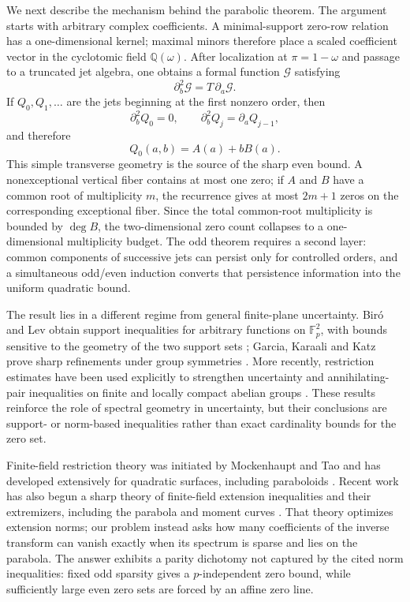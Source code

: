 \documentclass[11pt]{article}
\newcommand{\F}{\mathbb F}
\newcommand{\Q}{\mathbb Q}
\begin{document}
We next describe the mechanism behind the parabolic theorem.  The argument
starts with arbitrary complex coefficients.  A minimal-support zero-row
relation has a one-dimensional kernel; maximal minors therefore place a
scaled coefficient vector in the cyclotomic field $\Q(\omega)$.  After
localization at $\pi=1-\omega$ and passage to a truncated jet algebra, one
obtains a formal function $\mathcal G$ satisfying
\begin{equation}
 \partial_b^2\mathcal G=T\,\partial_a\mathcal G.
 \label{eq:intro-schrodinger}
\end{equation}
If $Q_0,Q_1,\ldots$ are the jets beginning at the first nonzero order, then
\[
 \partial_b^2Q_0=0,
 \qquad
 \partial_b^2Q_j=\partial_aQ_{j-1},
\]
and therefore
\[
 Q_0(a,b)=A(a)+bB(a).
\]
This simple transverse geometry is the source of the sharp even bound.  A
nonexceptional vertical fiber contains at most one zero; if $A$ and $B$ have
a common root of multiplicity $m$, the recurrence gives at most $2m+1$ zeros
on the corresponding exceptional fiber.  Since the total common-root
multiplicity is bounded by $\deg B$, the two-dimensional zero count collapses
to a one-dimensional multiplicity budget.  The odd theorem requires a second
layer: common components of successive jets can persist only for controlled
orders, and a simultaneous odd/even induction converts that persistence
information into the uniform quadratic bound.

The result lies in a different regime from general finite-plane uncertainty.
Bir\'o and Lev obtain support inequalities for arbitrary functions on
$\F_p^2$, with bounds sensitive to the geometry of the two support sets
\cite{BiroLev}; Garcia, Karaali and Katz prove sharp refinements under group
symmetries \cite{GarciaKaraaliKatz}.  More recently, restriction estimates
have been used explicitly to strengthen uncertainty and annihilating-pair
inequalities on finite and locally compact abelian groups
\cite{IosevichMayeli,IosevichJamingMayeli}.  These results reinforce the role
of spectral geometry in uncertainty, but their conclusions are support- or
norm-based inequalities rather than exact cardinality bounds for the zero set.

Finite-field restriction theory was initiated by Mockenhaupt and Tao
\cite{MockenhauptTao} and has developed extensively for quadratic surfaces,
including paraboloids \cite{Lewko,LewkoKakeya,IKL}.  Recent work has also
begun a sharp theory of finite-field extension inequalities and their
extremizers, including the parabola and moment curves
\cite{GonzalezOliveira,BiswasEtAl}.  That theory optimizes extension norms;
our problem instead asks how many coefficients of the inverse transform can
vanish exactly when its spectrum is sparse and lies on the parabola.  The
answer exhibits a parity dichotomy not captured by the cited norm inequalities:
fixed odd sparsity gives a $p$-independent zero bound, while sufficiently large
even zero sets are forced by an affine zero line.
\end{document}
